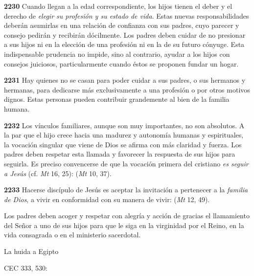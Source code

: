 \textbf{2230} Cuando llegan a la edad correspondiente, los hijos tienen el deber y el derecho de \emph{elegir su profesión y su estado de vida}. Estas nuevas responsabilidades deberán asumirlas en una relación de confianza con sus padres, cuyo parecer y consejo pedirán y recibirán dócilmente. Los padres deben cuidar de no presionar a sus hijos ni en la elección de una profesión ni en la de su futuro cónyuge. Esta indispensable prudencia no impide, sino al contrario, ayudar a los hijos con consejos juiciosos, particularmente cuando éstos se proponen fundar un hogar.

\textbf{2231} Hay quienes no se casan para poder cuidar a sus padres, o sus hermanos y hermanas, para dedicarse más exclusivamente a una profesión o por otros motivos dignos. Estas personas pueden contribuir grandemente al bien de la familia humana.

\textbf{2232} Los vínculos familiares, aunque son muy importantes, no son absolutos. A la par que el hijo crece hacia una madurez y autonomía humanas y espirituales, la vocación singular que viene de Dios se afirma con más claridad y fuerza. Los padres deben respetar esta llamada y favorecer la respuesta de sus hijos para seguirla. Es preciso convencerse de que la vocación primera del cristiano \emph{es seguir a Jesús} (cf. \emph{Mt} 16, 25):  (\emph{Mt} 10, 37).

\textbf{2233} Hacerse discípulo de Jesús es aceptar la invitación a pertenecer a la \emph{familia de Dios}, a vivir en conformidad con su manera de vivir:  (\emph{Mt} 12, 49).

Los padres deben acoger y respetar con alegría y acción de gracias el llamamiento del Señor a uno de sus hijos para que le siga en la virginidad por el Reino, en la vida consagrada o en el ministerio sacerdotal.

La huida a Egipto

CEC 333, 530:

